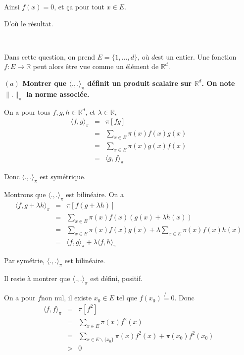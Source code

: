 Ainsi $f (x) = 0$, et {\c c}a pour tout $x \in E$.

D'o{\`u} le r{\'e}sultat.

\

 Dans cette question, on prend $E =\{1, . . ., d\}$, o{\`u}
$d$est un entier. Une fonction $f : E \rightarrow \mathbb{R}$ peut alors
{\^e}tre vue comme un {\'e}l{\'e}ment de $\mathbb{R}^d$.



\textbf{$(a)$ Montrer que $\langle ., . \rangle_{\pi}$ d{\'e}finit un produit scalaire sur $\mathbb{R}^d$. On note $\| . \|_{\pi}$ la norme associ{\'e}e. }

On a pour tous $f, g, h \in \mathbb{R}^d$, et $\lambda \in \mathbb{R}$,
\begin{eqnarray*}
  \langle f, g \rangle_{\pi} & = & \pi [f g]\\
  & = & \underset{x \in E}{\sum} \pi (x) f (x) g (x)\\
  & = & \underset{x \in E}{\sum} \pi (x) g (x) f (x)\\
  & = & \langle g, f \rangle_{\pi}
\end{eqnarray*}


Donc $\langle ., . \rangle_{\pi}$ est sym{\'e}trique.

Montrons que $\langle ., . \rangle_{\pi}$ est bilin{\'e}aire. On a
\begin{eqnarray*}
  \langle f, g + \lambda h \rangle_{\pi} & = & \pi [f (g + \lambda h)]\\
  & = & \underset{x \in E}{\sum} \pi (x) f (x) (g (x) + \lambda h (x))\\
  & = & \underset{x \in E}{\sum} \pi (x) f (x) g (x) + \lambda \underset{x
  \in E}{\sum} \pi (x) f (x) h (x)\\
  & = & \langle f, g \rangle_{\pi} + \lambda \langle f, h \rangle_{\pi}
\end{eqnarray*}


Par sym{\'e}trie, $\langle ., . \rangle_{\pi}$ est bilin{\'e}aire.

Il reste {\`a} montrer que $\langle ., . \rangle_{\pi}$ est d{\'e}fini,
positif.

On a pour $f$non nul, il existe $x_0 \in E$ tel que $f (x_0) \not{=} 0$. Donc
\begin{eqnarray*}
  \langle f, f \rangle_{\pi} & = & \pi [f^2]\\
  & = & \underset{x \in E}{\sum} \pi (x) f^2 (x)\\
  & = & \underset{x \in E \backslash \{ x_0 \}}{\sum} \pi (x) f^2 (x) + \pi
  (x_0) f^2 (x_0)\\
  & > & 0
\end{eqnarray*}


